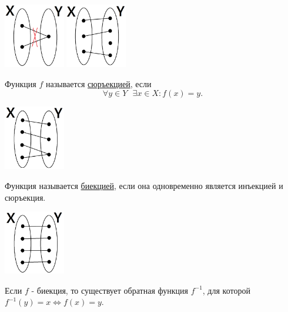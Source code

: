 	\begin{center}
		\includegraphics[width=0.2\textwidth]{img/lecture1/injection1}
		\includegraphics[width=0.2\textwidth]{img/lecture1/injection2}
	\end{center}
	
	\begin{definition}
		Функция $f$ называется \underline{сюръекцией}, если
		\[ \forall y \in Y \text{ } \exists x \in X : f(x) = y. \]
	\end{definition}
	
	\begin{center}
		\includegraphics[width=0.2\textwidth]{img/lecture1/surjection}
	\end{center}
	
	\begin{definition}
		Функция называется \underline{биекцией}, если она одновременно является инъекцией и сюръекция.
	\end{definition}
		
	\begin{center}
		\includegraphics[width=0.2\textwidth]{img/lecture1/bijection}
	\end{center}
	
	\begin{sentence}
		Если $f$ - биекция, то существует обратная функция $f^{-1}$, для которой $f^{-1}(y) = x \Leftrightarrow f(x) = y.$
	\end{sentence}
	

